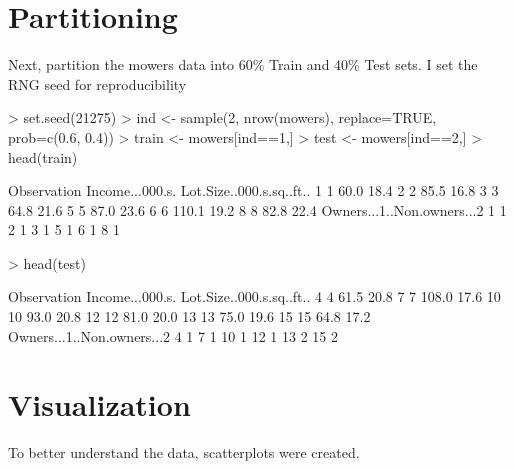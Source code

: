 \documentclass{article}
\begin{document}
\section*{Partitioning}
Next, partition the mowers data into 60\% Train and 40\% Test sets. I set the RNG seed for reproducibility
\begin{Schunk}
\begin{Sinput}
> set.seed(21275)
> ind <- sample(2, nrow(mowers), replace=TRUE, prob=c(0.6, 0.4))
> train <- mowers[ind==1,]
> test <- mowers[ind==2,]
> head(train)
\end{Sinput}
\begin{Soutput}
  Observation Income...000.s. Lot.Size..000.s.sq..ft..
1           1            60.0                     18.4
2           2            85.5                     16.8
3           3            64.8                     21.6
5           5            87.0                     23.6
6           6           110.1                     19.2
8           8            82.8                     22.4
  Owners...1..Non.owners...2
1                          1
2                          1
3                          1
5                          1
6                          1
8                          1
\end{Soutput}
\begin{Sinput}
> head(test)
\end{Sinput}
\begin{Soutput}
   Observation Income...000.s. Lot.Size..000.s.sq..ft..
4            4            61.5                     20.8
7            7           108.0                     17.6
10          10            93.0                     20.8
12          12            81.0                     20.0
13          13            75.0                     19.6
15          15            64.8                     17.2
   Owners...1..Non.owners...2
4                           1
7                           1
10                          1
12                          1
13                          2
15                          2
\end{Soutput}
\end{Schunk}

\section*{Visualization}
To better understand the data, scatterplots were created.
\end{document}
